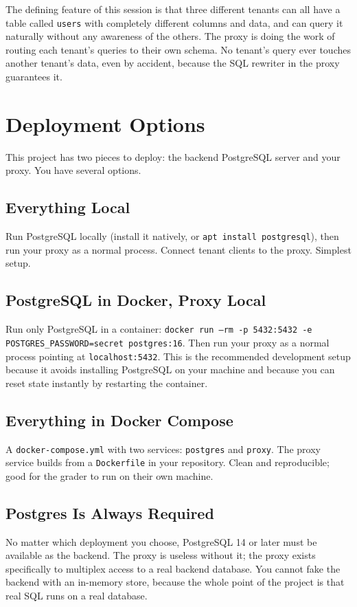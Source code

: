 \documentclass[11pt,a4paper]{article}
\begin{document}
The defining feature of this session is that three different tenants can all have a table called \texttt{users} with completely different columns and data, and can query it naturally without any awareness of the others. The proxy is doing the work of routing each tenant's queries to their own schema. No tenant's query ever touches another tenant's data, even by accident, because the SQL rewriter in the proxy guarantees it.

\section{Deployment Options}

This project has two pieces to deploy: the backend PostgreSQL server and your proxy. You have several options.

\subsection{Everything Local}
Run PostgreSQL locally (install it natively, or \texttt{apt install postgresql}), then run your proxy as a normal process. Connect tenant clients to the proxy. Simplest setup.

\subsection{PostgreSQL in Docker, Proxy Local}
Run only PostgreSQL in a container: \texttt{docker run --rm -p 5432:5432 -e POSTGRES\_PASSWORD=secret postgres:16}. Then run your proxy as a normal process pointing at \texttt{localhost:5432}. This is the recommended development setup because it avoids installing PostgreSQL on your machine and because you can reset state instantly by restarting the container.

\subsection{Everything in Docker Compose}
A \texttt{docker-compose.yml} with two services: \texttt{postgres} and \texttt{proxy}. The proxy service builds from a \texttt{Dockerfile} in your repository. Clean and reproducible; good for the grader to run on their own machine.

\subsection{Postgres Is Always Required}
No matter which deployment you choose, PostgreSQL 14 or later must be available as the backend. The proxy is useless without it; the proxy exists specifically to multiplex access to a real backend database. You cannot fake the backend with an in-memory store, because the whole point of the project is that real SQL runs on a real database.
\end{document}

